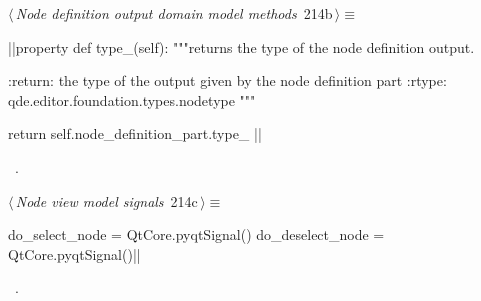 \documentclass[%
    a4paper,    %
    justified,  %
    nobib,      %
    openany     %
]{tufte-book}
\makeatletter
\renewcommand{\label}[1]{\@tufte@label{##1}}%
\makeatother
\begin{document}
\begin{fullwidth}
\begin{flushleft}
\begin{minipage}{\linewidth}
\begin{list}{}{\setlength{\itemsep}{-\parsep}\setlength{\itemindent}{-\leftmargin}}
\item{}
\end{list}
\end{minipage}\vspace{4ex}
\end{flushleft}
\begin{flushleft} \small
\begin{minipage}{\linewidth}\label{scrap217}\raggedright\small
{} $\langle\,${\itshape Node definition output domain model methods}\nobreak\ {\footnotesize {214b}}$\,\rangle\equiv$
\vspace{-1ex}
\begin{pythoncode}
|\normalfont{}\fontfamily{}|property
def type_(self):
    """returns the type of the node definition output.

    :return: the type of the output given by the node definition part
    :rtype:  qde.editor.foundation.types.nodetype
    """

    return self.node_definition_part.type_
|\NWsep|
\end{pythoncode}
\vspace{1.5ex}
\footnotesize
\begin{list}{}{\setlength{\itemsep}{-\parsep}\setlength{\itemindent}{-\leftmargin}}
\item \NWtxtMacroRefIn\ .

\item{}
\end{list}
\end{minipage}\vspace{4ex}
\end{flushleft}
\begin{flushleft} \small
\begin{minipage}{\linewidth}\label{scrap218}\raggedright\small
{} $\langle\,${\itshape Node view model signals}\nobreak\ {\footnotesize {214c}}$\,\rangle\equiv$
\vspace{-1ex}
\begin{pythoncode}
do_select_node = QtCore.pyqtSignal()
do_deselect_node = QtCore.pyqtSignal()|\NWsep|
\end{pythoncode}
\vspace{1.5ex}
\footnotesize
\begin{list}{}{\setlength{\itemsep}{-\parsep}\setlength{\itemindent}{-\leftmargin}}
\item \NWtxtMacroRefIn\ .


\end{list}
\end{minipage}
\end{flushleft}
\end{fullwidth}
\end{document}
